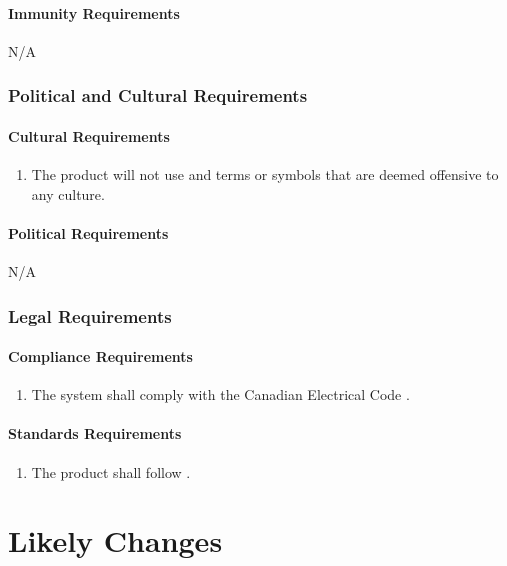 \documentclass[12pt]{article}
\begin{document}
\paragraph{Immunity Requirements}
N/A



\subsubsection{Political and Cultural Requirements}
\label{NFR_PC}
\paragraph{Cultural Requirements}
\begin{enumerate}[{PC}1., leftmargin=2\parindent]
    \item The product will not use and terms or symbols that are deemed offensive to any culture.
\end{enumerate}

\paragraph{Political Requirements}
N/A



\subsubsection{Legal Requirements}
\label{NFR_Legal}
\paragraph{Compliance Requirements}
\begin{enumerate}[{LR}1., leftmargin=2\parindent]
    \item The system shall comply with the Canadian Electrical Code \cite{CanadianElectricalCode2021}.
\end{enumerate}

\paragraph{Standards Requirements}
\begin{enumerate}[{LR}1., leftmargin=2\parindent, resume]
    \item The product shall follow \cite{WCAG2018}.
\end{enumerate}


\section{Likely Changes}
\end{document}
